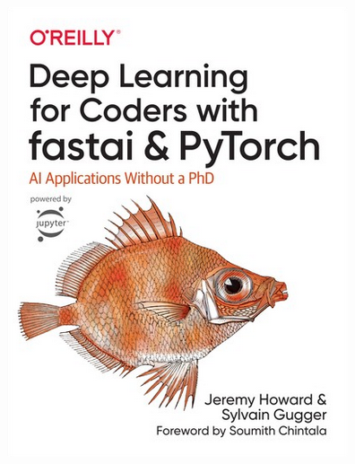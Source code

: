 \documentclass[12pt]{article} 	%
\begin{document}
\begin{figure}[h!]
    \begin{center}
        \includegraphics[scale=1.3]{img/fastbook.png}
    \end{center}
    \caption{\cite{howard2020deep}}
    \label{fig:fastbook}
\end{figure}


\newpage


\end{document}
